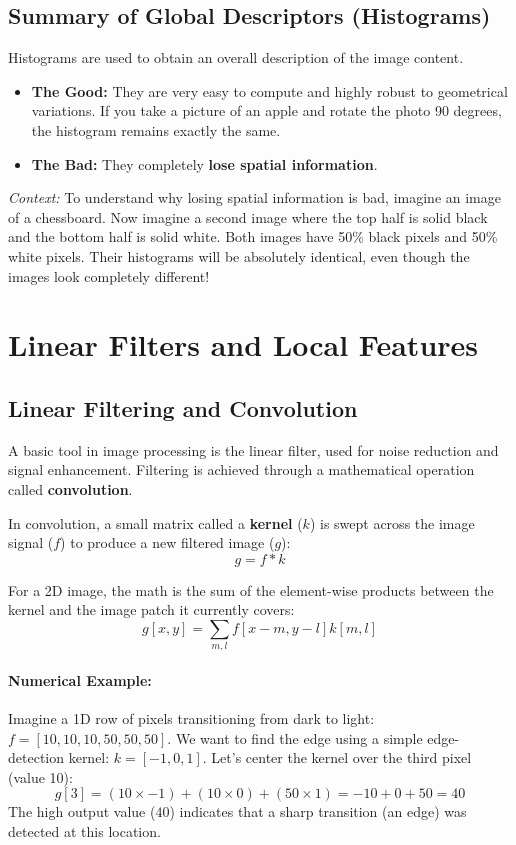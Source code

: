 \documentclass{report}
\begin{document}
\section{Summary of Global Descriptors (Histograms)}
Histograms are used to obtain an overall description of the image content.
\begin{itemize}
    \item \textbf{The Good:} They are very easy to compute and highly robust to geometrical variations. If you take a picture of an apple and rotate the photo 90 degrees, the histogram remains exactly the same.
    \item \textbf{The Bad:} They completely \textbf{lose spatial information}.
\end{itemize}

\textit{Context:} To understand why losing spatial information is bad, imagine an image of a chessboard. Now imagine a second image where the top half is solid black and the bottom half is solid white. Both images have 50\% black pixels and 50\% white pixels. Their histograms will be absolutely identical, even though the images look completely different!








\chapter{Linear Filters and Local Features}

\section{Linear Filtering and Convolution}
A basic tool in image processing is the linear filter, used for noise reduction and signal enhancement. Filtering is achieved through a mathematical operation called \textbf{convolution}.

In convolution, a small matrix called a \textbf{kernel} ($k$) is swept across the image signal ($f$) to produce a new filtered image ($g$):
\[ g = f * k \]

For a 2D image, the math is the sum of the element-wise products between the kernel and the image patch it currently covers:
\[ g[x,y] = \sum_{m,l} f[x-m, y-l] k[m,l] \]

\subsubsection{Numerical Example:}
Imagine a 1D row of pixels transitioning from dark to light: $f = [10, 10, 10, 50, 50, 50]$.
We want to find the edge using a simple edge-detection kernel: $k = [-1, 0, 1]$.
Let's center the kernel over the third pixel (value 10):
\[ g[3] = (10 \times -1) + (10 \times 0) + (50 \times 1) = -10 + 0 + 50 = 40 \]
The high output value ($40$) indicates that a sharp transition (an edge) was detected at this location.
\end{document}
